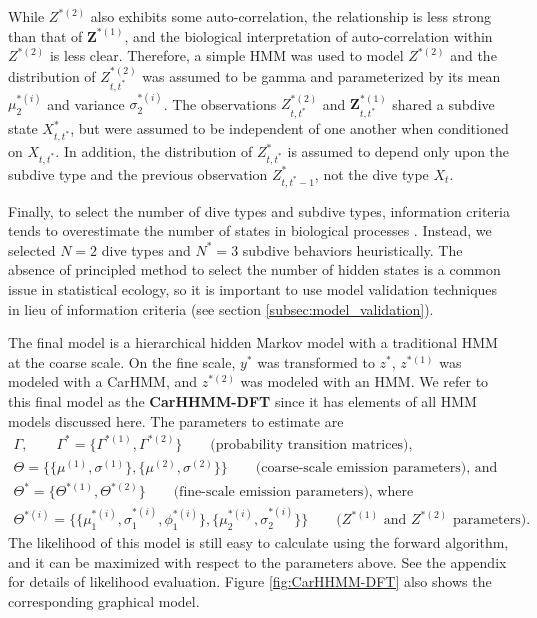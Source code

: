 While $Z^{*(2)}$ also exhibits some auto-correlation, the relationship is less strong than that of $\mathbf{Z}^{*(1)}$, and the biological interpretation of auto-correlation within $Z^{*(2)}$ is less clear. Therefore, a simple HMM was used to model $Z^{*(2)}$ and the distribution of $Z^{*(2)}_{t,t^*}$ was assumed to be gamma and parameterized by its mean $\mu_2^{*(i)}$ and variance $\sigma_2^{*(i)}$.
%
%
The observations $Z^{*(2)}_{t,t^*}$ and $\mathbf{Z}^{*(1)}_{t,t^*}$ shared a subdive state $X^*_{t,t^*}$, but were assumed to be independent of one another when conditioned on $X_{t,t^*}$. In addition, the distribution of $Z^*_{t,t^*}$ is assumed to depend only upon the subdive type and the previous observation $Z^*_{t,t^*-1}$, not the dive type $X_t$.

Finally, to select the number of dive types and subdive types, information criteria tends to overestimate the number of states in biological processes \citep{Pohle:2017}. Instead, we selected $N = 2$ dive types and $N^* = 3$ subdive behaviors heuristically. The absence of principled method to select the number of hidden states is a common issue in statistical ecology, so it is important to use model validation techniques in lieu of information criteria (see section \ref{subsec:model_validation}).

The final model is a hierarchical hidden Markov model with a traditional HMM at the coarse scale. On the fine scale, $y^*$ was transformed to $z^*$, $z^{*(1)}$ was modeled with a CarHMM, and $z^{*(2)}$ was modeled with an HMM. We refer to this final model as the \textbf{CarHHMM-DFT} since it has elements of all HMM models discussed here. The parameters to estimate are
%
\begin{gather*}
    \Gamma, \qquad \Gamma^{*} = \{\Gamma^{*(1)},\Gamma^{*(2)}\} \qquad \text{(probability transition matrices)}, \\
    \Theta = \{\{\mu^{(1)},\sigma^{(1)}\},\{\mu^{(2)},\sigma^{(2)}\}\} \qquad \text{(coarse-scale emission parameters), and} \\
    \Theta^* = \{\Theta^{*(1)},\Theta^{*(2)}\}  \qquad \text{(fine-scale emission parameters), where} \\
    \Theta^{*(i)} =  \{\{\mu_1^{*(i)},\sigma_1^{*(i)},\phi_1^{*(i)}\},\{\mu_2^{*(i)},\sigma_2^{*(i)}\}\} \qquad \text{(}Z^{*(1)} \text{ and } Z^{*(2)} \text{ parameters).}
\end{gather*}
%
The likelihood of this model is still easy to calculate using the forward algorithm, and it can be maximized with respect to the parameters above. See the appendix for details of likelihood evaluation. Figure \ref{fig:CarHHMM-DFT} also shows the corresponding graphical model.

